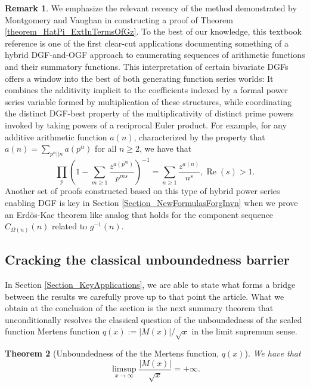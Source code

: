 \documentclass[11pt,reqno,a4letter]{article}
\numberwithin{figure}{section}
\numberwithin{table}{section}
\newcommand{\cf}{\textit{cf.\ }}
\theoremstyle{plain}
\newtheorem{theorem}{Theorem}
\numberwithin{theorem}{section}
\theoremstyle{definition}
\newtheorem{remark}[theorem]{Remark}
\renewcommand{\Re}{\operatorname{Re}}
\begin{document}
\begin{remark} 
\label{remark_MV_NewDGFApplications} 
We emphasize the relevant recency of the method demonstrated by 
Montgomery and Vaughan in constructing a proof of 
Theorem \ref{theorem_HatPi_ExtInTermsOfGz}. 
To the best of our knowledge, this textbook reference is 
one of the first clear-cut applications documenting something of a hybrid 
DGF-and-OGF approach to enumerating sequences of arithmetic functions 
and their summatory functions. 
This interpretation of certain bivariate DGFs 
offers a window into the best of both generating function series worlds: 
It combines the additivity 
implicit to the coefficients indexed by a formal power series variable formed by 
multiplication of these structures, while coordinating the distinct DGF-best 
property of the multiplicativity of distinct prime powers invoked 
by taking powers of a reciprocal Euler product. 
For example, for any additive arithmetic function $a(n)$, 
characterized by the property that 
$a(n) = \sum_{p^{\alpha} || n} a(p^{\alpha})$ for all $n \geq 2$, we have that 
\cite[\cf \S 1.7]{IWANIEC-KOWALSKI} 
\[
\prod_p \left( 
     1 - \sum_{m \geq 1} \frac{z^{a(p^m)}}{p^{ms}}\right)^{-1} = 
     \sum_{n \geq 1} \frac{z^{a(n)}}{n^s}, \Re(s) > 1. 
\]
Another set of proofs constructed based on this type of hybrid power series enabling 
DGF is key in Section \ref{Section_NewFormulasForgInvn} 
when we prove an Erd\"os-Kac theorem like analog 
that holds for the component sequence $C_{\Omega(n)}(n)$ related to $g^{-1}(n)$. 
\end{remark} 

\subsection{Cracking the classical unboundedness barrier} 

In Section \ref{Section_KeyApplications}, 
we are able to state what forms a bridge between the results 
we carefully prove up to that point the article. 
What we obtain at the conclusion of the section 
is the next summary theorem that unconditionally 
resolves the classical question of the 
unboundedness of the scaled function Mertens function 
$q(x) := |M(x)| / \sqrt{x}$ in the limit supremum sense. 

\begin{theorem}[Unboundedness of the the Mertens function, $q(x)$] 
\label{cor_ThePipeDreamResult_v1} 
We have that 
\[
\limsup_{x \rightarrow \infty} \frac{|M(x)|}{\sqrt{x}} = +\infty. 
\]
\end{theorem} 
\end{document}
